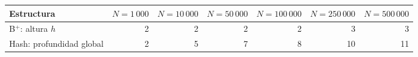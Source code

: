 \begin{tabular}{@{}lrrrrrr@{}}
\toprule
Estructura & $N=1\,000$ & $N=10\,000$ & $N=50\,000$ & $N=100\,000$ & $N=250\,000$ & $N=500\,000$ \\
\midrule
B$^+$: altura $h$ & 2 & 2 & 2 & 2 & 3 & 3 \\
Hash: profundidad global & 2 & 5 & 7 & 8 & 10 & 11 \\
\bottomrule
\end{tabular}
